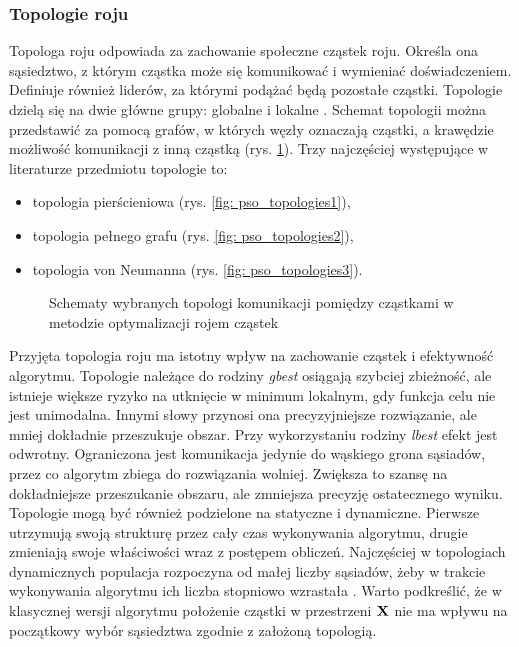 \subsubsection{Topologie roju}
Topologa roju odpowiada za zachowanie społeczne cząstek roju.  Określa ona sąsiedztwo, z którym cząstka może się komunikować i wymieniać doświadczeniem. Definiuje również liderów, za którymi podążać będą pozostałe cząstki. Topologie dzielą się na dwie główne grupy: globalne  i lokalne . Schemat topologii można przedstawić za pomocą grafów, w których węzły oznaczają cząstki, a krawędzie możliwość komunikacji z inną cząstką (rys. \ref{fig: pso_topologies}). Trzy najczęściej występujące w literaturze przedmiotu topologie to:
\begin{itemize}
	\item topologia pierścieniowa (rys. \ref{fig: pso_topologies1}),
	\item topologia pełnego grafu (rys. \ref{fig: pso_topologies2}),
	\item topologia von Neumanna (rys. \ref{fig: pso_topologies3}).
\end{itemize}
\begin{figure}[hbt!]
	\centering
	\captionsetup{justification=centering}
	\caption{Schematy wybranych topologi komunikacji pomiędzy cząstkami w metodzie optymalizacji rojem cząstek}
	\label{fig: pso_topologies}
\end{figure}
Przyjęta topologia roju ma istotny wpływ na zachowanie cząstek i efektywność algorytmu. Topologie należące do rodziny \textit{gbest} osiągają szybciej zbieżność, ale istnieje większe ryzyko na utknięcie w minimum lokalnym, gdy funkcja celu nie jest unimodalna. Innymi słowy przynosi ona precyzyjniejsze rozwiązanie, ale mniej dokładnie przeszukuje obszar. Przy wykorzystaniu rodziny \textit{lbest} efekt jest odwrotny. Ograniczona jest komunikacja jedynie do wąskiego grona sąsiadów, przez co algorytm zbiega do rozwiązania wolniej. Zwiększa to szansę na dokładniejsze przeszukanie obszaru, ale zmniejsza precyzję ostatecznego wyniku. Topologie mogą być również podzielone na statyczne i dynamiczne. Pierwsze utrzymują swoją strukturę przez cały czas wykonywania algorytmu, drugie zmieniają swoje właściwości wraz z postępem obliczeń. Najczęściej w topologiach dynamicznych populacja rozpoczyna od małej liczby sąsiadów, żeby w trakcie wykonywania algorytmu ich liczba stopniowo wzrastała \parencite{Poli2007}. Warto podkreślić, że w klasycznej wersji algorytmu położenie cząstki w przestrzeni $\mathbf{X}$ nie ma wpływu na początkowy wybór sąsiedztwa zgodnie z założoną topologią.

